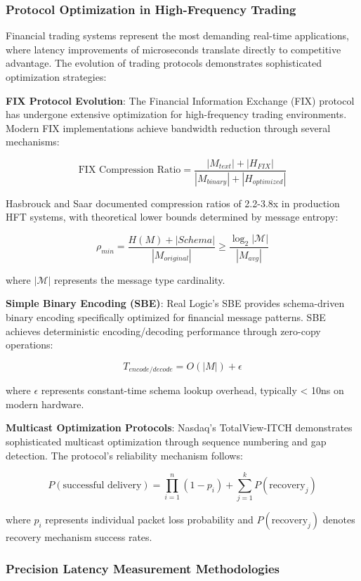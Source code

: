 \documentclass[12pt,a4paper]{article}
\begin{document}
\subsubsection{Protocol Optimization in High-Frequency Trading}

Financial trading systems represent the most demanding real-time applications, where latency improvements of microseconds translate directly to competitive advantage. The evolution of trading protocols demonstrates sophisticated optimization strategies:

\textbf{FIX Protocol Evolution}: The Financial Information Exchange (FIX) protocol has undergone extensive optimization for high-frequency trading environments. Modern FIX implementations achieve bandwidth reduction through several mechanisms:

$$\text{FIX Compression Ratio} = \frac{|M_{text}| + |H_{FIX}|}{|M_{binary}| + |H_{optimized}|}$$

Hasbrouck and Saar \cite{hasbrouck2013low} documented compression ratios of 2.2-3.8x in production HFT systems, with theoretical lower bounds determined by message entropy:

$$\rho_{min} = \frac{H(M) + |Schema|}{|M_{original}|} \geq \frac{\log_2|\mathcal{M}|}{|M_{avg}|}$$

where $|\mathcal{M}|$ represents the message type cardinality.

\textbf{Simple Binary Encoding (SBE)}: Real Logic's SBE \cite{sbe2023} provides schema-driven binary encoding specifically optimized for financial message patterns. SBE achieves deterministic encoding/decoding performance through zero-copy operations:

$$T_{encode/decode} = O(|M|) + \epsilon$$

where $\epsilon$ represents constant-time schema lookup overhead, typically < 10ns on modern hardware.

\textbf{Multicast Optimization Protocols}: Nasdaq's TotalView-ITCH \cite{nasdaq2023itch} demonstrates sophisticated multicast optimization through sequence numbering and gap detection. The protocol's reliability mechanism follows:

$$P(\text{successful delivery}) = \prod_{i=1}^{n} (1 - p_i) + \sum_{j=1}^{k} P(\text{recovery}_j)$$

where $p_i$ represents individual packet loss probability and $P(\text{recovery}_j)$ denotes recovery mechanism success rates.

\subsubsection{Precision Latency Measurement Methodologies}
\end{document}
